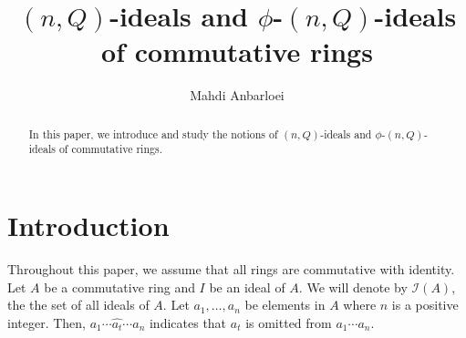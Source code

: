 \documentclass[preprint,review,10pt]{amsart}
\theoremstyle{definition}
\theoremstyle{remark}
\numberwithin{equation}{section}
\begin{document}
\title{$(n,Q)$-ideals and $\phi$-$(n,Q)$-ideals of commutative rings }


\author{Mahdi Anbarloei}
\address{Department of Mathematics, Faculty of Sciences,
Imam Khomeini International University, Qazvin, Iran.
}






 

\begin{abstract}
 In this paper, we introduce and study the notions of  $(n,Q)$-ideals and $\phi$-$(n,Q)$-ideals of commutative rings. 

\end{abstract}
\maketitle

\section{Introduction} 
Throughout this paper, we assume  that all rings are commutative with identity. Let $A$ be a commutative ring and $I$ be an ideal of $A$. We will denote by $\mathcal{I}(A)$, the the set of all ideals of $A$. Let $a_1,\ldots,a_n$ be elements in $A$ where  $n$ is a positive integer. Then,  $a_1\cdots \widehat{a_t} \cdots a_n$ indicates that $a_t$ is omitted from $a_1 \cdots a_n$.
\end{document}

